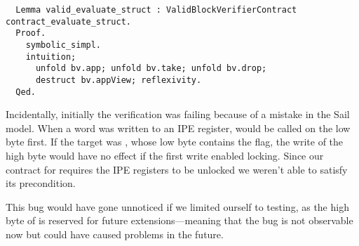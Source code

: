 \begin{verbatim}
  Lemma valid_evaluate_struct : ValidBlockVerifierContract contract_evaluate_struct.
  Proof.
    symbolic_simpl.
    intuition;
      unfold bv.app; unfold bv.take; unfold bv.drop;
      destruct bv.appView; reflexivity.
  Qed.
\end{verbatim}

Incidentally, initially the verification was failing because of a mistake in the Sail model. When a word was written to an IPE register,  would be called on the low byte first. If the target was , whose low byte contains the  flag, the write of the high byte would have no effect if the first write enabled locking. Since our contract for  requires the IPE registers to be unlocked we weren't able to satisfy its precondition.

This bug would have gone unnoticed if we limited ourself to testing, as the high byte of  is reserved for future extensions---meaning that the bug is not observable now but could have caused problems in the future.
